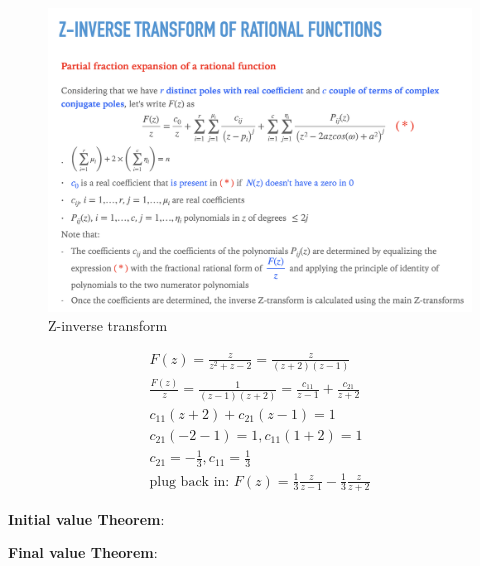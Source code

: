 \documentclass[11pt]{article}
\begin{document}
\begin{figure}[htbp]
  \centerline{\includegraphics[width=1\textwidth]{../../images/z_inverse_transform.png}}
  \caption{Z-inverse transform}
  \label{fig:z_inverse_transform}
\end{figure}

\begin{gather}
  F(z) = \frac{z}{z^2+z-2} = \frac{z}{(z+2)(z-1)}\\
  \frac{F(z)}{z} = \frac{1}{(z-1)(z+2)} = \frac{c_{11}}{z-1} + \frac{c_{21}}{z+2} \\
  c_{11}(z+2) + c_{21}(z-1) = 1 \\
  c_{21}(-2-1) = 1, c_{11}(1 + 2) = 1 \\
  c_{21} = -\frac{1}{3}, c_{11} = \frac{1}{3} \\
  \text{plug back in: } F(z) = \frac{1}{3}\frac{z}{z-1} - \frac{1}{3} \frac{z}{z+2}
\end{gather}

\textbf{Initial value Theorem}:
\\ 

\textbf{Final value Theorem}:
\\
\end{document}
